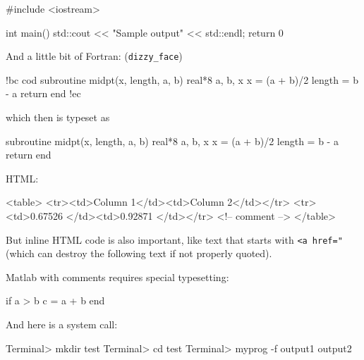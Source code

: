 \documentclass[%
oneside,                 %
final,                   %
10pt]{article}
\theoremstyle{definition}
\begin{document}
\bcpppro
#include <iostream>

int main()
{
   std::cout << "Sample output" << std::endl;
   return 0
}

\ecpppro

And a little bit of Fortran: (\Verb!dizzy_face!)










\bdo
!bc cod
      subroutine midpt(x, length, a, b)
      real*8 a, b, x
      x = (a + b)/2
      length = b - a
      return
      end
!ec

\edo

which then is typeset as








\bcod
      subroutine midpt(x, length, a, b)
      real*8 a, b, x
      x = (a + b)/2
      length = b - a
      return
      end

\ecod


HTML:







\bhtmlcod
<table>
<tr><td>Column 1</td><td>Column 2</td></tr>
<tr><td>0.67526 </td><td>0.92871 </td></tr>
<!-- comment -->
</table>

\ehtmlcod


But inline HTML code is also important, like text that starts with
\texttt{<a href="} (which can destroy the following text if not properly
quoted).

Matlab with comments requires special typesetting:







\bmcod
if a > b
  c = a + b
end

\emcod


And here is a system call:







\bsys
Terminal> mkdir test
Terminal> cd test
Terminal> myprog -f
output1
output2

\esys
\end{document}
